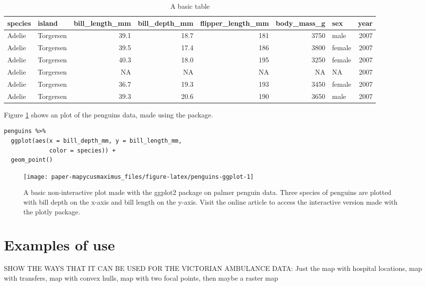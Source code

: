 \begin{table}
\centering
\caption{\label{tab:penguins-tab-static}A basic table}
\centering
\fontsize{7}{9}\selectfont
\begin{tabular}[t]{l|l|r|r|r|r|l|r}
\hline
species & island & bill\_length\_mm & bill\_depth\_mm & flipper\_length\_mm & body\_mass\_g & sex & year\\
\hline
Adelie & Torgersen & 39.1 & 18.7 & 181 & 3750 & male & 2007\\
\hline
Adelie & Torgersen & 39.5 & 17.4 & 186 & 3800 & female & 2007\\
\hline
Adelie & Torgersen & 40.3 & 18.0 & 195 & 3250 & female & 2007\\
\hline
Adelie & Torgersen & NA & NA & NA & NA & NA & 2007\\
\hline
Adelie & Torgersen & 36.7 & 19.3 & 193 & 3450 & female & 2007\\
\hline
Adelie & Torgersen & 39.3 & 20.6 & 190 & 3650 & male & 2007\\
\hline
\end{tabular}
\end{table}

Figure \ref{fig:penguins-ggplot} shows an plot of the penguins data, made using the  package.

\begin{verbatim}
penguins %>% 
  ggplot(aes(x = bill_depth_mm, y = bill_length_mm, 
             color = species)) + 
  geom_point()
\end{verbatim}

\begin{figure}
\texttt{[image: paper-mapycusmaximus\_files/figure-latex/penguins-ggplot-1]} \caption{A basic non-interactive plot made with the ggplot2 package on palmer penguin data. Three species of penguins are plotted with bill depth on the x-axis and bill length on the y-axis. Visit the online article to access the interactive version made with the plotly package.}\label{fig:penguins-ggplot}
\end{figure}

\section{Examples of use}\label{examples-of-use}

SHOW THE WAYS THAT IT CAN BE USED FOR THE VICTORIAN AMBULANCE DATA: Just the map with hospital locations, map with transfers, map with convex hulls, map with two focal points, then maybe a raster map


